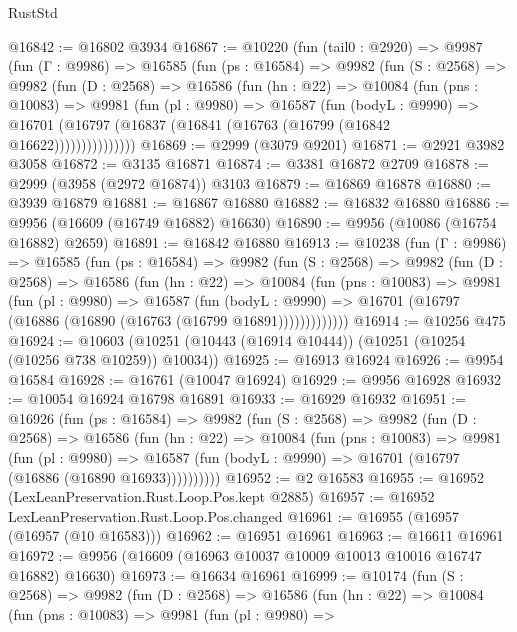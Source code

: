 \begin{lexlean}{RustStd}
\begin{coremodule}
@16842 := @16802 @3934
@16867 := @10220
    (fun (tail0 : @2920) =>
    @9987
      (fun (Γ : @9986) =>
      @16585
        (fun (ps : @16584) =>
        @9982
          (fun (S : @2568) =>
          @9982
            (fun (D : @2568) =>
            @16586
              (fun (hn : @22) =>
              @10084
                (fun (pns : @10083) =>
                @9981
                  (fun (pl : @9980) =>
                  @16587
                    (fun (bodyL : @9990) =>
                    @16701 (@16797 (@16837 (@16841 (@16763 (@16799 (@16842 @16622)))))))))))))))
@16869 := @2999 (@3079 @9201)
@16871 := @2921 @3982 @3058
@16872 := @3135 @16871
@16874 := @3381 @16872 @2709
@16878 := @2999 (@3958 (@2972 @16874)) @3103
@16879 := @16869 @16878
@16880 := @3939 @16879
@16881 := @16867 @16880
@16882 := @16832 @16880
@16886 := @9956 (@16609 (@16749 @16882) @16630)
@16890 := @9956 (@10086 (@16754 @16882) @2659)
@16891 := @16842 @16880
@16913 := @10238
    (fun (Γ : @9986) =>
    @16585
      (fun (ps : @16584) =>
      @9982
        (fun (S : @2568) =>
        @9982
          (fun (D : @2568) =>
          @16586
            (fun (hn : @22) =>
            @10084
              (fun (pns : @10083) =>
              @9981
                (fun (pl : @9980) =>
                @16587
                  (fun (bodyL : @9990) =>
                  @16701 (@16797 (@16886 (@16890 (@16763 (@16799 @16891)))))))))))))
@16914 := @10256 @475
@16924 := @10603 (@10251 (@10443 (@16914 @10444)) (@10251 (@10254 (@10256 @738 @10259)) @10034))
@16925 := @16913 @16924
@16926 := @9954 @16584
@16928 := @16761 (@10047 @16924)
@16929 := @9956 @16928
@16932 := @10054 @16924 @16798 @16891
@16933 := @16929 @16932
@16951 := @16926
    (fun (ps : @16584) =>
    @9982
      (fun (S : @2568) =>
      @9982
        (fun (D : @2568) =>
        @16586
          (fun (hn : @22) =>
          @10084
            (fun (pns : @10083) =>
            @9981
              (fun (pl : @9980) =>
              @16587 (fun (bodyL : @9990) => @16701 (@16797 (@16886 (@16890 @16933))))))))))
@16952 := @2 @16583
@16955 := @16952 (LexLeanPreservation.Rust.Loop.Pos.kept @2885)
@16957 := @16952 LexLeanPreservation.Rust.Loop.Pos.changed
@16961 := @16955 (@16957 (@16957 (@10 @16583)))
@16962 := @16951 @16961
@16963 := @16611 @16961
@16972 := @9956 (@16609 (@16963 @10037 @10009 @10013 @10016 @16747 @16882) @16630)
@16973 := @16634 @16961
@16999 := @10174
    (fun (S : @2568) =>
    @9982
      (fun (D : @2568) =>
      @16586
        (fun (hn : @22) =>
        @10084
          (fun (pns : @10083) =>
          @9981
            (fun (pl : @9980) =>

\end{coremodule}
\end{lexlean}

